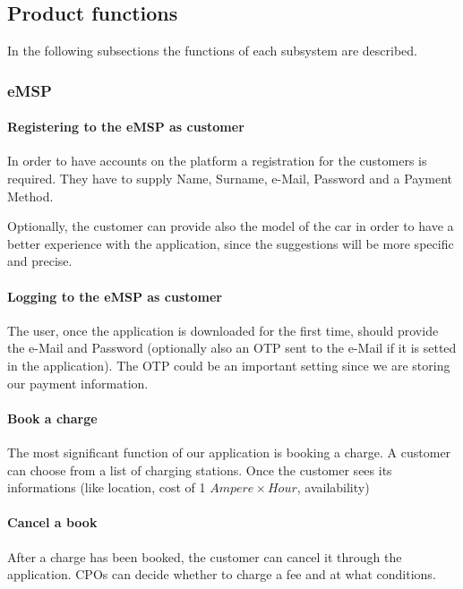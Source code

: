 \subsection{Product functions}
In the following subsections the functions of each subsystem are described.


\subsubsection{\ac{eMSP}}
\paragraph{Registering to the \ac{eMSP} as customer}
In order to have accounts on the platform a registration for the customers is required. They have to supply Name, Surname, e-Mail, Password and a Payment Method.

Optionally, the customer can provide also the model of the car in order to have a better experience with the application, since the suggestions will be more specific and precise.

\paragraph{Logging to the \ac{eMSP} as customer}
The user, once the application is downloaded for the first time, should provide the e-Mail and Password (optionally also an OTP sent to the e-Mail if it is setted in the application). The OTP could be an important setting since we are storing our payment information.

\paragraph{Book a charge}
The most significant function of our application is booking a charge. A customer can choose from a list of charging stations. Once the customer sees its informations (like location, cost of 1 $Ampere \times Hour$, availability)

\paragraph{Cancel a book}
After a charge has been booked, the customer can cancel it through the application. \acp{CPO} can decide whether to charge a fee and at what conditions.

